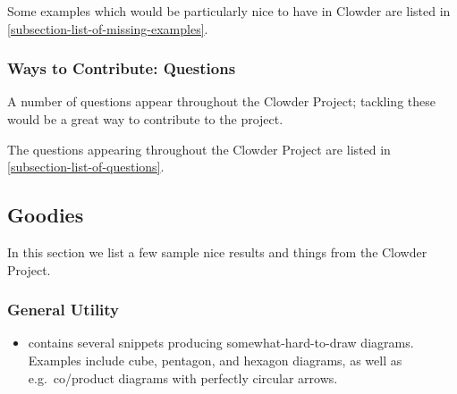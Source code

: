 Some examples which would be particularly nice to have in Clowder are listed in \cref{subsection-list-of-missing-examples}.
\subsubsection{Ways to Contribute: Questions}\label{subsubsection-ways-to-contribute-questions}
A number of questions appear throughout the Clowder Project; tackling these would be a great way to contribute to the project.

The questions appearing throughout the Clowder Project are listed in \cref{subsection-list-of-questions}.
\subsection{Goodies}\label{subsection-goodies}
In this section we list a few sample nice results and things from the Clowder Project.
\subsubsection{General Utility}\label{subsubsection-goodies-general-utility}
\begin{itemize}
    \item {} contains several  snippets producing somewhat-hard-to-draw diagrams. Examples include cube, pentagon, and hexagon diagrams, as well as e.g.\ co/product diagrams with perfectly circular arrows.
\end{itemize}
